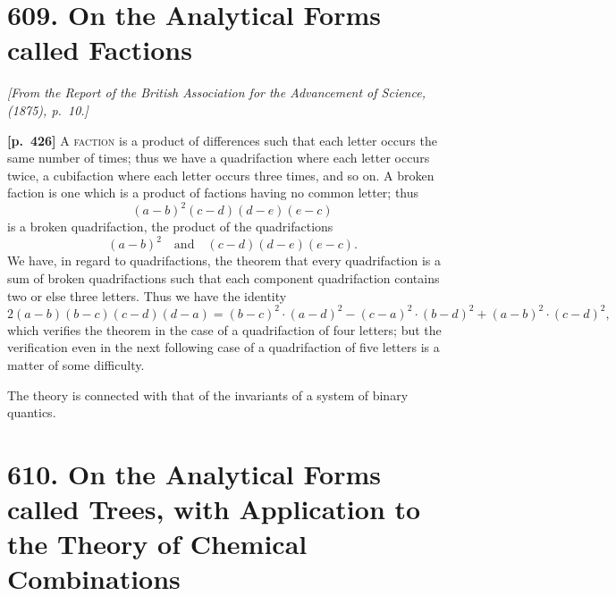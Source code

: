 \documentclass[11pt,a4paper]{article}
\begin{document}
\bigskip
\section*{\textbf{609.} On the Analytical Forms called Factions}

\noindent\textit{[From the Report of the British Association for the Advancement of Science, (1875), p.~10.]}

\bigskip
\noindent\textbf{[p.~426]}\quad
A \textsc{faction} is a product of differences such that each letter occurs the same number of times; thus we have a quadrifaction where each letter occurs twice, a cubifaction where each letter occurs three times, and so on. A broken faction is one which is a product of factions having no common letter; thus
\[
(a-b)^{2}(c-d)(d-e)(e-c)
\]
is a broken quadrifaction, the product of the quadrifactions
\[
(a-b)^{2}\quad\text{and}\quad (c-d)(d-e)(e-c).
\]
We have, in regard to quadrifactions, the theorem that every quadrifaction is a sum of broken quadrifactions such that each component quadrifaction contains two or else three letters. Thus we have the identity
\[
2(a-b)(b-c)(c-d)(d-a) = (b-c)^{2}\cdot(a-d)^{2} - (c-a)^{2}\cdot(b-d)^{2} + (a-b)^{2}\cdot(c-d)^{2},
\]
which verifies the theorem in the case of a quadrifaction of four letters; but the verification even in the next following case of a quadrifaction of five letters is a matter of some difficulty.

The theory is connected with that of the invariants of a system of binary quantics.

\bigskip
\section*{\textbf{610.} On the Analytical Forms called Trees, with Application to the Theory of Chemical Combinations}
\end{document}

